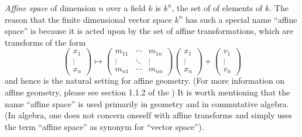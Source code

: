 \documentclass{article}
\begin{document}
{\em Affine space} of dimension $n$ over a field $k$ is $k^n$, the set of  of elements of $k$.  The reason that the finite dimensional vector space $k^n$ has such a special name ``affine space'' is because it is acted upon by the set of affine transformations, which are transforms of the form
 $$\left( \begin{matrix} x_1 \\ \vdots \\ x_n \end{matrix} \right) \mapsto \left( \begin{matrix} m_{11} & \cdots & m_{1n} \\ \vdots & \ddots & \vdots \\ m_{n1} & \cdots & m_{nn} \end{matrix} \right) \left( \begin{matrix} x_1 \\ \vdots \\ x_n \end{matrix} \right) + \left( \begin{matrix} v_1 \\ \vdots \\ v_n \end{matrix} \right)$$
and hence is the natural setting for affine geometry.  (For more information on affine geometry, please see section 1.1.2 of the )  It is worth mentioning that the name ``affine space'' is used primarily in geometry and in commutative algebra.  (In algebra, one does not concern oneself with affine transforms and simply uses the term ``affine space'' as synonym for ``vector space'').
\end{document}
